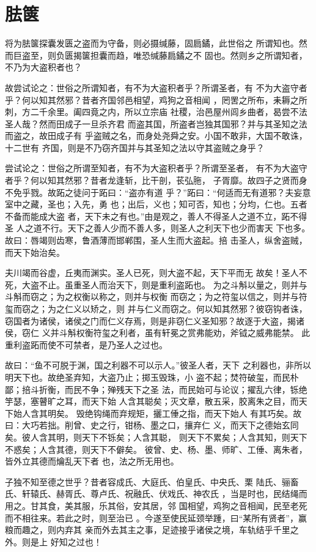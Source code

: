 \documentclass[12pt,UTF8]{ctexbook}
\begin{document}
\section{胠箧}

将为胠箧探囊发匮之盗而为守备，则必摄缄藤，固扃鐍，此世俗之 所谓知也。然而巨盗至，则负匮揭箧担囊而趋，唯恐缄藤扃鐍之不 固也。然则乡之所谓知者，不乃为大盗积者也？

故尝试论之：世俗之所谓知者，有不为大盗积者乎？所谓圣者，有 不为大盗守者乎？何以知其然邪？昔者齐国邻邑相望，鸡狗之音相闻 ，罔罟之所布，耒耨之所刺，方二千余里。阖四竟之内，所以立宗庙 社稷，治邑屋州闾乡曲者，曷尝不法圣人哉？然而田成子一旦杀齐君 而盗其国，所盗者岂独其国邪？并与其圣知之法而盗之，故田成子有 乎盗贼之名，而身处尧舜之安。小国不敢非，大国不敢诛，十二世有 齐国，则是不乃窃齐国并与其圣知之法以守其盗贼之身乎？

尝试论之：世俗之所谓至知者，有不为大盗积者乎？所谓至圣者， 有不为大盗守者乎？何以知其然邪？昔者龙逢斩，比干剖，苌弘胣， 子胥靡。故四子之贤而身不免乎戮。故跖之徒问于跖曰：“盗亦有道 乎？”跖曰：“何适而无有道邪？夫妄意室中之藏，圣也；入先，勇 也；出后，义也；知可否，知也；分均，仁也。五者不备而能成大盗 者，天下未之有也。”由是观之，善人不得圣人之道不立，跖不得圣 人之道不行。天下之善人少而不善人多，则圣人之利天下也少而害天 下也多。故曰：唇竭则齿寒，鲁酒薄而邯郸围，圣人生而大盗起。掊 击圣人，纵舍盗贼，而天下始治矣。

夫川竭而谷虚，丘夷而渊实。圣人已死，则大盗不起，天下平而无 故矣！圣人不死，大盗不止。虽重圣人而治天下，则是重利盗跖也。 为之斗斛以量之，则并与斗斛而窃之；为之权衡以称之，则并与权衡 而窃之；为之符玺以信之，则并与符玺而窃之；为之仁义以矫之，则 并与仁义而窃之。何以知其然邪？彼窃钩者诛，窃国者为诸侯，诸侯之门而仁义存焉，则是非窃仁义圣知邪？故逐于大盗，揭诸侯，窃仁 义并斗斛权衡符玺之利者，虽有轩冕之赏弗能劝，斧钺之威弗能禁。 此重利盗跖而使不可禁者，是乃圣人之过也。

故曰：“鱼不可脱于渊，国之利器不可以示人。”彼圣人者，天下 之利器也，非所以明天下也。故绝圣弃知，大盗乃止；掷玉毁珠，小 盗不起；焚符破玺，而民朴鄙；掊斗折衡，而民不争；殚残天下之圣 法，而民始可与论议；擢乱六律，铄绝竽瑟，塞瞽旷之耳，而天下始 人含其聪矣；灭文章，散五采，胶离朱之目，而天下始人含其明矣。 毁绝钩绳而弃规矩，攦工倕之指，而天下始人 有其巧矣。故曰：大巧若拙。削曾、史之行，钳杨、墨之口，攘弃仁 义，而天下之德始玄同矣。彼人含其明，则天下不铄矣；人含其聪， 则天下不累矣；人含其知，则天下不惑矣；人含其德，则天下不僻矣。 彼曾、史、杨、墨、师旷、工倕、离朱者，皆外立其德而爚乱天下者 也，法之所无用也。

子独不知至德之世乎？昔者容成氏、大庭氏、伯皇氏、中央氏、栗 陆氏、骊畜氏、轩辕氏、赫胥氏、尊卢氏、祝融氏、伏戏氏、神农氏 ，当是时也，民结绳而用之。甘其食，美其服，乐其俗，安其居，邻 国相望，鸡狗之音相闻，民至老死而不相往来。若此之时，则至治已 。今遂至使民延颈举踵，曰“某所有贤者”，赢粮而趣之，则内弃其 亲而外去其主之事，足迹接乎诸侯之境，车轨结乎千里之外。则是上 好知之过也！
\end{document}
